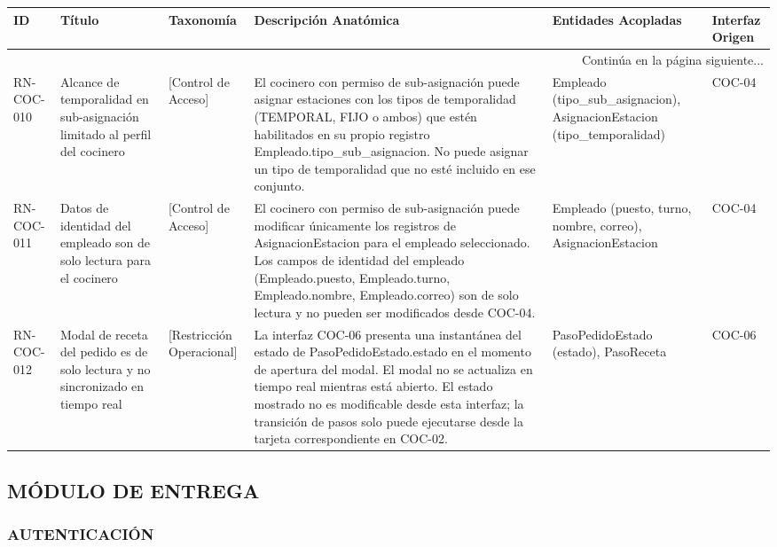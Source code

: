 \begin{landscape}
\begin{longtable}[c]{l p{2.1cm} p{2.1cm} p{8cm} p{4cm} p{3cm}}
\toprule
\textbf{ID} & \textbf{Título} & \textbf{Taxonomía} & \textbf{Descripción Anatómica} & \textbf{Entidades Acopladas} & \textbf{Interfaz Origen} \\
\midrule
\endhead

\midrule
\multicolumn{6}{r}{\small Continúa en la página siguiente...} \\
\endfoot
\bottomrule
\endlastfoot

RN-COC-010 & Alcance de temporalidad en sub-asignación limitado al perfil del cocinero & [Control de Acceso] & El cocinero con permiso de sub-asignación puede asignar estaciones con los tipos de temporalidad (TEMPORAL, FIJO o ambos) que estén habilitados en su propio registro Empleado.tipo\_sub\_asignacion. No puede asignar un tipo de temporalidad que no esté incluido en ese conjunto. & Empleado (tipo\_sub\_asignacion), AsignacionEstacion (tipo\_temporalidad) & COC-04 \\
\addlinespace
RN-COC-011 & Datos de identidad del empleado son de solo lectura para el cocinero & [Control de Acceso] & El cocinero con permiso de sub-asignación puede modificar únicamente los registros de AsignacionEstacion para el empleado seleccionado. Los campos de identidad del empleado (Empleado.puesto, Empleado.turno, Empleado.nombre, Empleado.correo) son de solo lectura y no pueden ser modificados desde COC-04. & Empleado (puesto, turno, nombre, correo), AsignacionEstacion & COC-04 \\
\addlinespace
RN-COC-012 & Modal de receta del pedido es de solo lectura y no sincronizado en tiempo real & [Restricción Operacional] & La interfaz COC-06 presenta una instantánea del estado de PasoPedidoEstado.estado en el momento de apertura del modal. El modal no se actualiza en tiempo real mientras está abierto. El estado mostrado no es modificable desde esta interfaz; la transición de pasos solo puede ejecutarse desde la tarjeta correspondiente en COC-02. & PasoPedidoEstado (estado), PasoReceta & COC-06 \\
\end{longtable}
\endgroup

\subsection{MÓDULO DE ENTREGA}
\subsubsection{AUTENTICACIÓN}
\begingroup
\setlength{\LTleft}{\fill}
\setlength{\LTright}{\fill}


\end{landscape}
